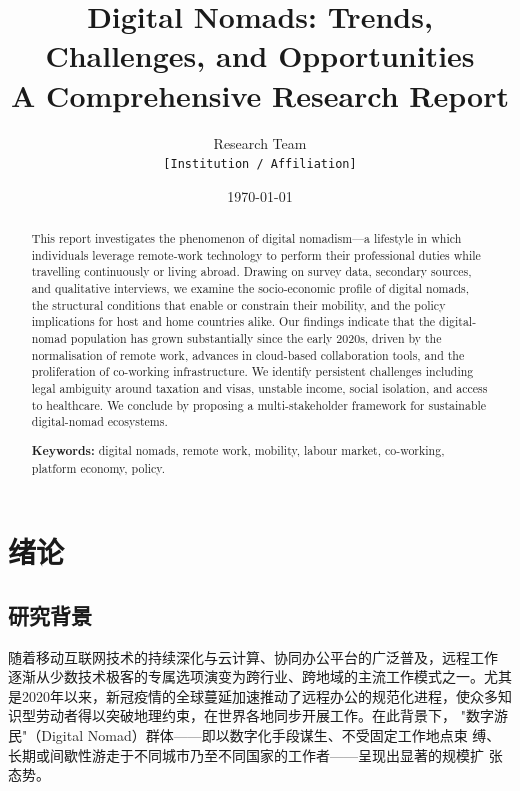 \documentclass[12pt,a4paper]{article}
\title{%
  \textbf{Digital Nomads: Trends, Challenges, and Opportunities}\\[0.4em]
  \large A Comprehensive Research Report
}
\author{%
  \normalsize Research Team\\[0.2em]
  \small \texttt{[Institution / Affiliation]}
}
\date{\today}
\begin{document}

\maketitle
\thispagestyle{empty}

\begin{abstract}
This report investigates the phenomenon of digital nomadism—a lifestyle in
which individuals leverage remote-work technology to perform their professional
duties while travelling continuously or living abroad. Drawing on survey data,
secondary sources, and qualitative interviews, we examine the socio-economic
profile of digital nomads, the structural conditions that enable or constrain
their mobility, and the policy implications for host and home countries alike.
Our findings indicate that the digital-nomad population has grown substantially
since the early 2020s, driven by the normalisation of remote work, advances in
cloud-based collaboration tools, and the proliferation of co-working
infrastructure. We identify persistent challenges including legal ambiguity
around taxation and visas, unstable income, social isolation, and access to
healthcare. We conclude by proposing a multi-stakeholder framework for
sustainable digital-nomad ecosystems.

\medskip\noindent\textbf{Keywords:} digital nomads, remote work, mobility,
labour market, co-working, platform economy, policy.
\end{abstract}

\clearpage
\tableofcontents
\clearpage

\section{绪论}
\label{sec:intro}

\subsection{研究背景}

随着移动互联网技术的持续深化与云计算、协同办公平台的广泛普及，远程工作
逐渐从少数技术极客的专属选项演变为跨行业、跨地域的主流工作模式之一。尤其
是2020年以来，新冠疫情的全球蔓延加速推动了远程办公的规范化进程，使众多知
识型劳动者得以突破地理约束，在世界各地同步开展工作。在此背景下，
"数字游民"（Digital Nomad）群体——即以数字化手段谋生、不受固定工作地点束
缚、长期或间歇性游走于不同城市乃至不同国家的工作者——呈现出显著的规模扩
张态势\citep{MBO2023}。
\end{document}

